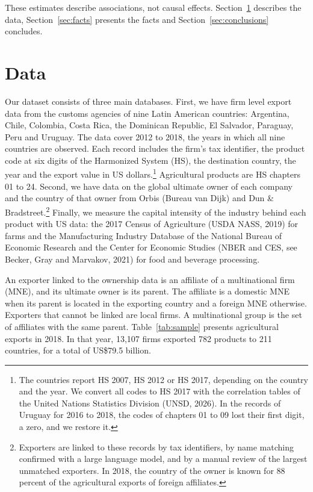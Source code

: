 \documentclass[article, 12pt, 3p]{elsarticle}
\numberwithin{corollary}{proposition}
\begin{document}
These estimates describe associations, not causal effects. Section~\ref{sec:data} describes the data,
Section~\ref{sec:facts} presents the facts and Section~\ref{sec:conclusions} concludes.

\section{Data}\label{sec:data}

Our dataset consists of three main databases. First, we have firm level export data from the customs agencies of
nine Latin American countries: Argentina, Chile, Colombia, Costa Rica, the Dominican Republic, El Salvador, Paraguay,
Peru and Uruguay. The data cover 2012 to 2018, the years in which all nine countries are observed. Each record includes
the firm's tax identifier, the product code at six digits of the Harmonized System (HS), the destination country, the
year and the export value in US dollars.\footnote{The countries report HS 2007, HS 2012 or HS 2017, depending on the
country and the year. We convert all codes to HS 2017 with the correlation tables of the United Nations Statistics
Division (UNSD, 2026). In the records of Uruguay for 2016 to 2018, the codes of chapters 01 to 09 lost their first
digit, a zero, and we restore it.} Agricultural products are HS chapters 01 to 24. Second, we have data on the global
ultimate owner of each company and the country of that owner from Orbis (Bureau van Dijk) and Dun \& Bradstreet.\footnote{Exporters
are linked to these records by tax identifiers, by name matching confirmed with a large language model, and by a manual
review of the largest unmatched exporters. In 2018, the country of the owner is known for 88 percent of the agricultural
exports of foreign affiliates.} Finally, we measure the capital intensity of the industry behind each product with US
data: the 2017 Census of Agriculture (USDA NASS, 2019) for farms and the Manufacturing Industry Database of the National
Bureau of Economic Research and the Center for Economic Studies (NBER and CES, see Becker, Gray and Marvakov, 2021) for food
and beverage processing.

An exporter linked to the ownership data is an affiliate of a multinational firm (MNE), and its ultimate owner is its
parent. The affiliate is a domestic MNE when its parent is located in the exporting country and a foreign MNE otherwise.
Exporters that cannot be linked are local firms. A multinational group is the set of affiliates with the same parent.
Table~\ref{tab:sample} presents agricultural exports in 2018. In that year, 13,107 firms exported 782 products to 211
countries, for a total of US\$79.5 billion.
\end{document}
